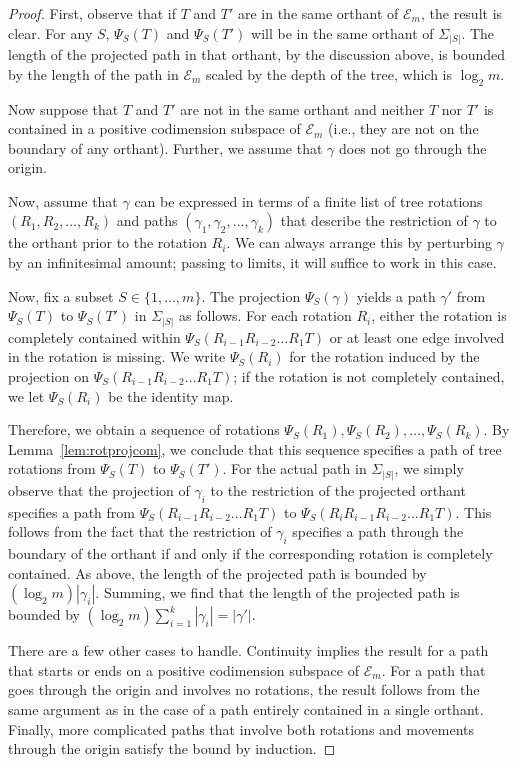 \documentclass[a4paper,11pt]{article}
\newcommand{\aE}{\mathcal{E}}
\begin{document}
\begin{proof}
First, observe that if $T$ and $T'$ are in the same orthant of $\aE_m$, the result is clear. 
For any $S$, $\Psi_S(T)$ and $\Psi_S(T')$ will be in the same orthant of $\Sigma_{|S|}$.
The length of the projected path in that orthant, by the discussion above, is bounded by the length of the path in $\aE_m$ scaled by the depth of the tree, which is $\log_2 m$.

Now suppose that $T$ and $T'$ are not in the same orthant and neither $T$ nor $T'$ is contained in a positive codimension subspace of $\aE_m$ (i.e., they are not on the boundary of any orthant).
Further, we assume that $\gamma$ does not go through the origin.

Now, assume that $\gamma$ can be expressed in terms of a finite list
of tree rotations $(R_1, R_2, \ldots, R_k)$ and paths $(\gamma_1,
\gamma_2, \ldots, \gamma_k)$ that describe the restriction of $\gamma$
to the orthant prior to the rotation $R_i$.  We can always arrange
this by perturbing $\gamma$ by an infinitesimal amount; passing to
limits, it will suffice to work in this case.

Now, fix a subset $S \in \{1,\ldots,m\}$.  The projection
$\Psi_S(\gamma)$ yields a path $\gamma'$ from $\Psi_S(T)$ to
$\Psi_S(T')$ in $\Sigma_{|S|}$ as follows.  For each rotation $R_i$,
either the rotation is completely contained within $\Psi_S(R_{i-1}
R_{i-2} \ldots R_1 T)$ or at least one edge involved in the rotation
is missing.  We write $\Psi_S(R_i)$ for the rotation induced by the
projection on $\Psi_S(R_{i-1} R_{i-2} \ldots R_1 T)$; if the rotation
is not completely contained, we let $\Psi_S(R_i)$ be the identity map.

Therefore, we obtain a sequence of rotations $\Psi_S(R_1),
\Psi_S(R_2), \ldots, \Psi_S(R_k)$.  By Lemma~\ref{lem:rotprojcom}, we
conclude that this sequence specifies a path of tree rotations from
$\Psi_S(T)$ to $\Psi_S(T')$.  For the actual path in $\Sigma_{|S|}$,
we simply observe that the projection of $\gamma_i$ to the restriction
of the projected orthant specifies a path from $\Psi_S(R_{i-1} R_{i-2}
\ldots R_1 T)$ to $\Psi_S(R_i R_{i-1} R_{i-2} \ldots R_1 T)$.  This
follows from the fact that the restriction of $\gamma_i$ specifies a
path through the boundary of the orthant if and only if the
corresponding rotation is completely contained.  As above, the length
of the projected path is bounded by $(\log_2 m) |\gamma_i|$.  Summing,
we find that the length of the projected path is bounded by $(\log_2
m) \sum_{i=1}^k |\gamma_i| = |\gamma'|$.

There are a few other cases to handle.  Continuity implies the result for a path that starts or ends on a positive codimension subspace of $\aE_m$.
For a path that goes through the origin and involves no rotations, the result follows from the same argument as in the case of a path entirely contained in a single orthant.
Finally, more complicated paths that involve both rotations and
movements through the origin satisfy the bound by induction.
\end{proof}
\end{document}
